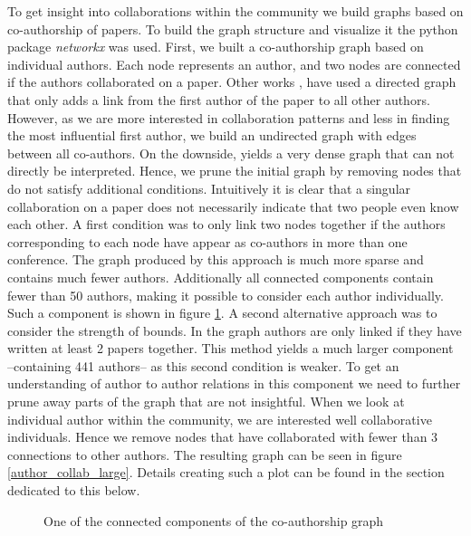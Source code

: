 \documentclass[journal,twocolumn]{IEEEtran}
\begin{document}
To get insight into collaborations within the community we build graphs
based on co-authorship of papers. To build the graph structure and
visualize it the python package \emph{networkx} was used. First, we
built a co-authorship graph based on individual authors. Each node
represents an author, and two nodes are connected if the authors
collaborated on a paper. Other works \cite{cheong2009social},
\cite{hesford2006management} have used a directed graph that only adds a
link from the first author of the paper to all other authors. However,
as we are more interested in collaboration patterns and less in finding
the most influential first author, we build an undirected graph with
edges between all co-authors. On the downside, yields a very dense graph
that can not directly be interpreted. Hence, we prune the initial graph
by removing nodes that do not satisfy additional conditions. Intuitively
it is clear that a singular collaboration on a paper does not
necessarily indicate that two people even know each other. A first
condition was to only link two nodes together if the authors
corresponding to each node have appear as co-authors in more than one
conference. The graph produced by this approach is much more sparse and
contains much fewer authors. Additionally all connected components
contain fewer than 50 authors, making it possible to consider each
author individually. Such a component is shown in figure \ref{fig_plot}.
A second alternative approach was to consider the strength of bounds. In
the graph authors are only linked if they have written at least 2 papers
together. This method yields a much larger component --containing 441
authors-- as this second condition is weaker. To get an understanding of
author to author relations in this component we need to further prune
away parts of the graph that are not insightful. When we look at
individual author within the community, we are interested well
collaborative individuals. Hence we remove nodes that have collaborated
with fewer than 3 connections to other authors. The resulting graph can
be seen in figure \ref{author_collab_large}. Details creating such a
plot can be found in the section dedicated to this below.


    \begin{figure}
        \begin{center}\end{center}
        \caption{One of the connected components of the co-authorship graph}
        \label{fig_plot}
    \end{figure}
    
\end{document}
